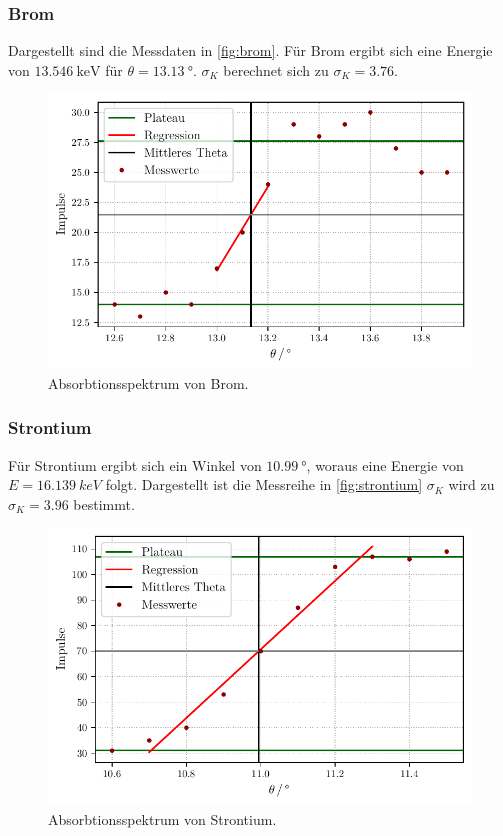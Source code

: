 \subsubsection{Brom}
Dargestellt sind die Messdaten in \autoref{fig:brom}.
Für Brom ergibt sich eine Energie von $\qty{13.546}{\keV}$ für $\theta = \qty{13.13}{°}$.
$\sigma_K$ berechnet sich zu $\sigma_K = 3.76$.
\begin{figure} [H]
  \centering
  \caption{Absorbtionsspektrum von Brom.}
  \label{fig:brom}
  \includegraphics[width=0.5 \linewidth]{build/brom.pdf}
\end{figure}


\subsubsection{Strontium}
Für Strontium ergibt sich ein Winkel von $\qty{10.99}{°}$, woraus eine Energie von $E = \qty{16.139}{keV}$ folgt.
Dargestellt ist die Messreihe in \autoref{fig:strontium}
$\sigma_K$ wird zu $\sigma_K = 3.96$ bestimmt.
\begin{figure}[H]
  \centering
  \caption{Absorbtionsspektrum von Strontium.}
  \label{fig:strontium}
  \includegraphics[width=0.5 \linewidth]{build/strontium.pdf}
\end{figure}

